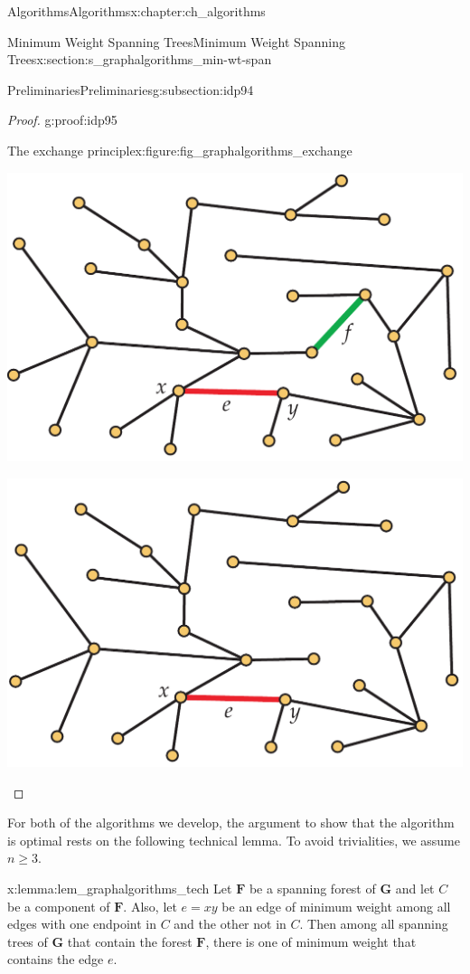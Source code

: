\documentclass[oneside,10pt,]{book}
\numberwithin{equation}{section}
\newcommand{\bfG}{\mathbf{G}}
\newcommand{\bfF}{\mathbf{F}}
\begin{document}
\begin{chapterptx}{Algorithms}{}{Algorithms}{}{}{x:chapter:ch_algorithms}
\begin{sectionptx}{Minimum Weight Spanning Trees}{}{Minimum Weight Spanning Trees}{}{}{x:section:s_graphalgorithms_min-wt-span}
\begin{subsectionptx}{Preliminaries}{}{Preliminaries}{}{}{g:subsection:idp94}
\begin{proof}{}{g:proof:idp95}
\begin{figureptx}{The exchange principle}{x:figure:fig_graphalgorithms_exchange}{}
\begin{sidebyside}{2}{0.01}{0.01}{0.02}
\begin{sbspanel}{0.48}%
\includegraphics[width=\linewidth]{images/exchange1}
\end{sbspanel}%
\begin{sbspanel}{0.48}%
\includegraphics[width=\linewidth]{images/exchange2}
\end{sbspanel}%
\end{sidebyside}%
\tcblower
\end{figureptx}%
\end{proof}
For both of the algorithms we develop, the argument to show that the algorithm is optimal rests on the following technical lemma. To avoid trivialities, we assume \(n\ge3\).%
\begin{lemma}{}{}{x:lemma:lem_graphalgorithms_tech}%
Let \(\bfF\) be a spanning forest of \(\bfG\) and let \(C\) be a component of \(\bfF\). Also, let \(e=xy\) be an edge of minimum weight among all edges with one endpoint in \(C\) and the other not in \(C\). Then among all spanning trees of \(\bfG\) that contain the forest \(\bfF\), there is one of minimum weight that contains the edge \(e\).%

\end{lemma}
\end{subsectionptx}
\end{sectionptx}
\end{chapterptx}
\end{document}
